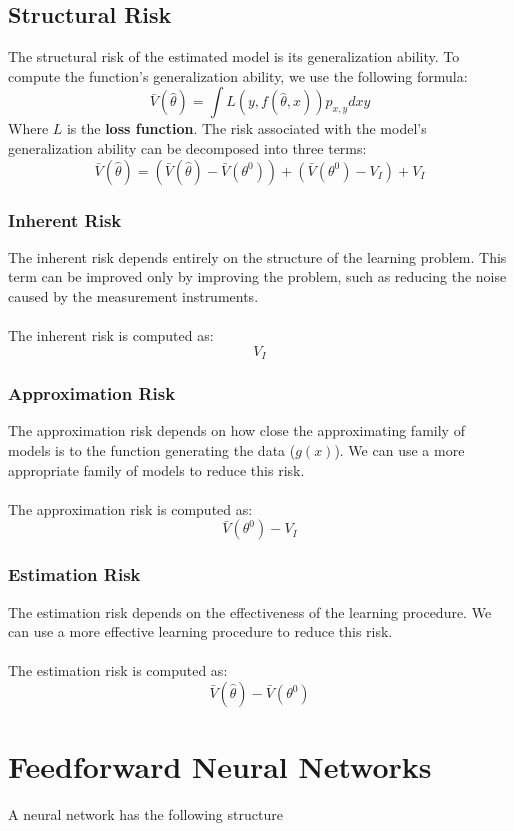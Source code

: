 \documentclass{article}
\begin{document}
\subsection{Structural Risk}
The structural risk of the estimated model is its generalization ability. To compute the function's generalization ability, we use the following formula:
\[ \bar V(\hat\theta) = \int L(y, f(\hat\theta, x)) p_{x, y} dxy \]
Where $L$ is the \textbf{loss function}. The risk associated with the model's generalization ability can be decomposed into three terms:
\[ \bar V(\hat\theta) = (\bar V(\hat\theta) - \bar V(\theta^0)) + (\bar V(\theta^0) - V_I) + V_I \]

\subsubsection{Inherent Risk}
The inherent risk depends entirely on the structure of the learning problem. This term can be improved only by improving the problem, such as reducing the noise caused by the measurement instruments. \\ \\
The inherent risk is computed as:
\[ V_I \]

\subsubsection{Approximation Risk}
The approximation risk depends on how close the approximating family of models is to the function generating the data ($g(x)$). We can use a more appropriate family of models to reduce this risk. \\ \\
The approximation risk is computed as:
\[ \bar V(\theta^0) - V_I \]

\subsubsection{Estimation Risk}
The estimation risk depends on the effectiveness of the learning procedure. We can use a more effective learning procedure to reduce this risk. \\ \\
The estimation risk is computed as:
\[ \bar V(\hat\theta) - \bar V(\theta^0) \]

\section{Feedforward Neural Networks}
A neural network has the following structure \\ \\
\end{document}

